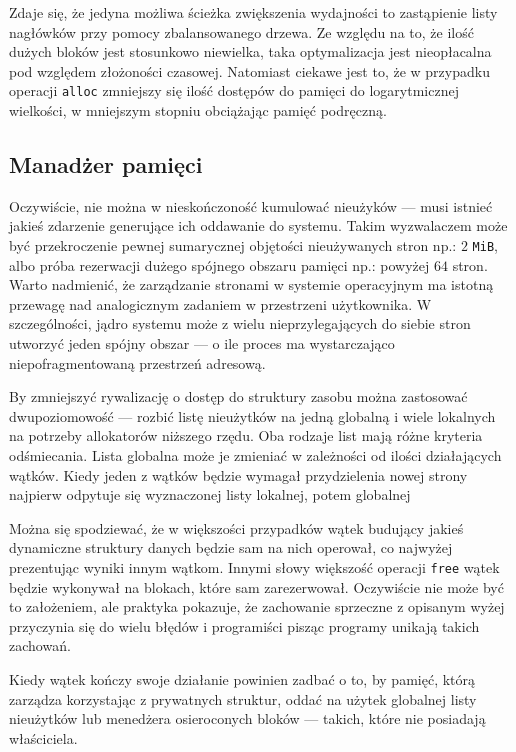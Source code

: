 \documentclass[12pt,a4paper,titlepage,twoside]{mwart}
\begin{document}
Zdaje się, że jedyna możliwa ścieżka zwiększenia wydajności to zastąpienie
listy nagłówków przy pomocy zbalansowanego drzewa. Ze względu na to, że ilość
dużych bloków jest stosunkowo niewielka, taka optymalizacja jest nieopłacalna
pod względem złożoności czasowej. Natomiast ciekawe jest to, że w przypadku
operacji \verb+alloc+ zmniejszy się ilość dostępów do pamięci do logarytmicznej
wielkości, w mniejszym stopniu obciążając pamięć podręczną.

\newpage

\subsection{Manadżer pamięci}

Oczywiście, nie można w nieskończoność kumulować nieużyków --- musi istnieć
jakieś zdarzenie generujące ich oddawanie do systemu. Takim wyzwalaczem może
być przekroczenie pewnej sumarycznej objętości nieużywanych stron np.: $2$
\verb+MiB+, albo próba rezerwacji dużego spójnego obszaru pamięci np.: powyżej
$64$ stron. Warto nadmienić, że zarządzanie stronami w systemie operacyjnym ma
istotną przewagę nad analogicznym zadaniem w przestrzeni użytkownika. W
szczególności, jądro systemu może z wielu nieprzylegających do siebie stron
utworzyć jeden spójny obszar --- o ile proces ma wystarczająco
niepofragmentowaną przestrzeń adresową.

By zmniejszyć rywalizację o dostęp do struktury zasobu można zastosować
dwupoziomowość --- rozbić listę nieużytków na jedną globalną i wiele lokalnych na
potrzeby allokatorów niższego rzędu.  Oba rodzaje list mają różne kryteria
odśmiecania. Lista globalna może je zmieniać w zależności od ilości
działających wątków. Kiedy jeden z wątków będzie wymagał przydzielenia nowej
strony najpierw odpytuje się wyznaczonej listy lokalnej, potem globalnej

Można się spodziewać, że w większości przypadków wątek budujący jakieś
dynamiczne struktury danych będzie sam na nich operował, co najwyżej
prezentując wyniki innym wątkom. Innymi słowy większość operacji \verb+free+
wątek będzie wykonywał na blokach, które sam zarezerwował. Oczywiście nie może
być to założeniem, ale praktyka pokazuje, że zachowanie sprzeczne z opisanym
wyżej przyczynia się do wielu błędów i programiści pisząc programy unikają
takich zachowań.

Kiedy wątek kończy swoje działanie powinien zadbać o to, by pamięć, którą
zarządza korzystając z prywatnych struktur, oddać na użytek globalnej listy
nieużytków lub menedżera osieroconych bloków --- takich, które nie posiadają
właściciela.
\end{document}
